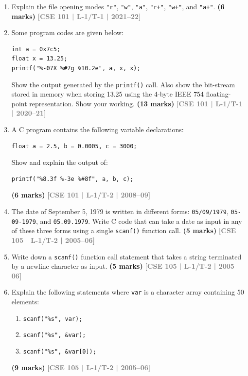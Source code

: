 \documentclass[12pt,a3paper]{article}
\newcommand{\yr}[1]{\hfill\textcolor{gray}{\small\textbf{[#1]}}}
\newcommand{\mk}[1]{\textcolor{orange!70!black}{\small\textbf{(#1 marks)}}}
\begin{document}
\begin{enumerate}

\item Explain the file opening modes \texttt{"r"}, \texttt{"w"}, \texttt{"a"}, \texttt{"r+"}, \texttt{"w+"}, and \texttt{"a+"}.
\mk{6} \yr{CSE 101 | L-1/T-1 | 2021--22}

\item Some program codes are given below:
 
\begin{lstlisting}
int a = 0x7c5;
float x = 13.25;
printf("%-07X %#7g %10.2e", a, x, x);
\end{lstlisting}
Show the output generated by the \texttt{printf()} call. Also show the bit-stream stored in memory when storing 13.25 using the 4-byte IEEE 754 floating-point representation. Show your working.
\mk{13} \yr{CSE 101 | L-1/T-1 | 2020--21}

\item A C program contains the following variable declarations:
\begin{lstlisting}
float a = 2.5, b = 0.0005, c = 3000;
\end{lstlisting}
Show and explain the output of:
\begin{lstlisting}
printf("%8.3f %-3e %#8f", a, b, c);
\end{lstlisting}
\mk{6} \yr{CSE 101 | L-1/T-2 | 2008--09}

\item The date of September 5, 1979 is written in different forms: \texttt{05/09/1979}, \texttt{05-09-1979}, and \texttt{05.09.1979}. Write C code that can take a date as input in any of these three forms using a single \texttt{scanf()} function call.
\mk{5} \yr{CSE 105 | L-1/T-2 | 2005--06}

\item Write down a \texttt{scanf()} function call statement that takes a string terminated by a newline character as input.
\mk{5} \yr{CSE 105 | L-1/T-2 | 2005--06}

\item Explain the following statements where \texttt{var} is a character array containing 50 elements:
\begin{enumerate}
  \item \texttt{scanf("\%s", var);}
  \item \texttt{scanf("\%s", \&var);}
  \item \texttt{scanf("\%s", \&var[0]);}
\end{enumerate}
\mk{9} \yr{CSE 105 | L-1/T-2 | 2005--06}

\end{enumerate}
\end{document}
